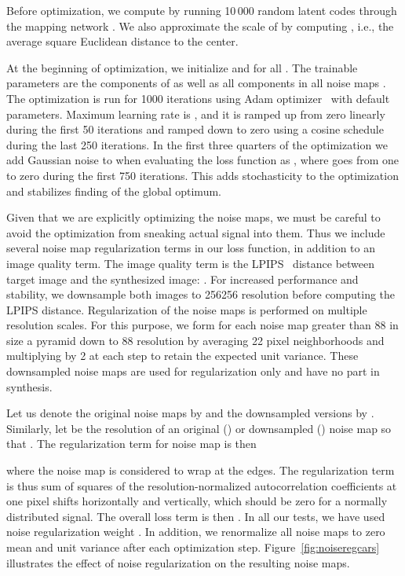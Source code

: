 \documentclass[10pt,twocolumn,letterpaper]{article}
\begin{document}
Before optimization, we compute  by running 10\,000 random latent codes  through the mapping network .
We also approximate the scale of  by computing , i.e., the average square Euclidean distance to the center.

At the beginning of optimization, we initialize  and  for all . 
The trainable parameters are the components of  as well as all components in all noise maps .
The optimization is run for 1000 iterations using Adam optimizer~\cite{adam} with default parameters.
Maximum learning rate is , and it is ramped up from zero linearly during the first 50 iterations and ramped down to zero using a cosine schedule during the last 250 iterations.
In the first three quarters of the optimization we add Gaussian noise to  when evaluating the loss function 
as , where  goes from one to zero during the first 750 iterations.
This adds stochasticity to the optimization and stabilizes finding of the global optimum.

Given that we are explicitly optimizing the noise maps, we must be careful to avoid the optimization from sneaking actual signal into them.
Thus we include several noise map regularization terms in our loss function, in addition to an image quality term. 
The image quality term is the LPIPS~\cite{Zhang2018metric} distance between target image  and the synthesized image:
.
For increased performance and stability, we downsample both images to 256256 resolution before computing the LPIPS distance.
Regularization of the noise maps is performed on multiple resolution scales.
For this purpose, we form for each noise map greater than 88 in size a pyramid down to 88 resolution by averaging 22 pixel neighborhoods and multiplying by 2 at each step to retain the expected unit variance. 
These downsampled noise maps are used for regularization only and have no part in synthesis.

Let us denote the original noise maps by  and the downsampled versions by .
Similarly, let  be the resolution of an original () or downsampled () noise map so that .
The regularization term for noise map  is then

where the noise map is considered to wrap at the edges.
The regularization term is thus sum of squares of the resolution-normalized autocorrelation coefficients at one pixel shifts horizontally and vertically, which should be zero for a normally distributed signal.
The overall loss term is then . In all our tests, we have used noise regularization weight .
In addition, we renormalize all noise maps to zero mean and unit variance after each optimization step. Figure~\ref{fig:noiseregcars} illustrates the effect of noise regularization on the resulting noise maps.
\end{document}
